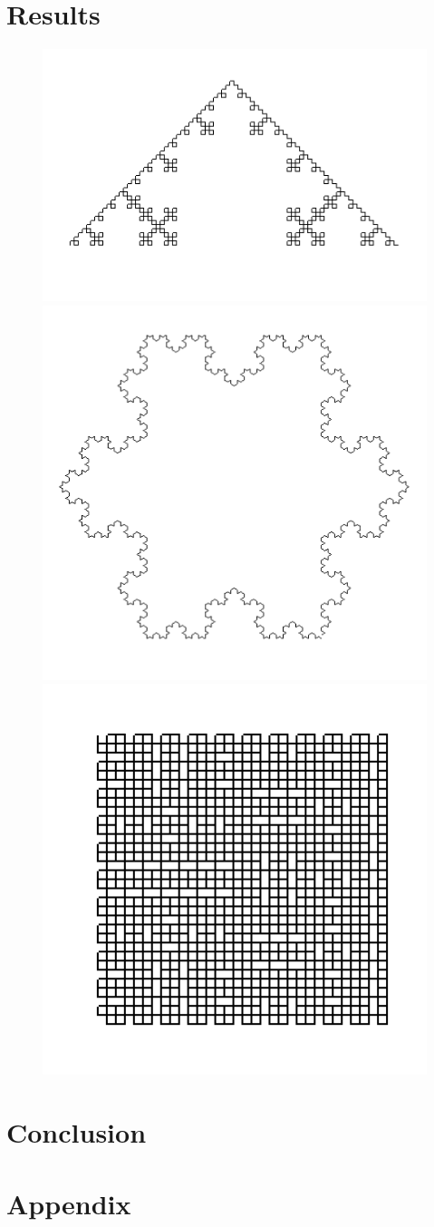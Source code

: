 \documentclass{article}
\begin{document}
\section{Results}
\label{results}

\begin{figure}[!h]
\centering
\includegraphics[width=0.48 \textwidth]{Images/result1.png}
\includegraphics[width=0.48 \textwidth]{Images/result2.png}
\includegraphics[width=0.48 \textwidth]{Images/result3.png}
\vskip -6pt
\label{fig:example_level}
\end{figure}

\section{Conclusion}
\label{conclusion}

\section{Appendix}
\end{document}

